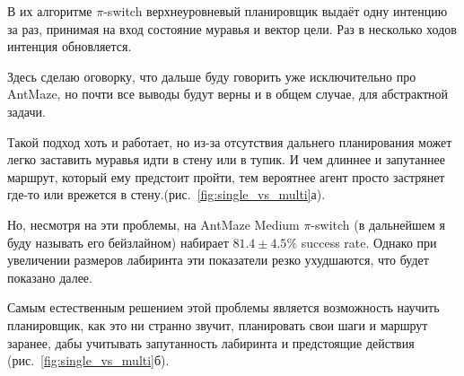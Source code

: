 В их алгоритме $\pi$-switch верхнеуровневый планировщик выдаёт одну интенцию за раз, принимая на вход состояние муравья и вектор цели. Раз в несколько ходов интенция обновляется. 

Здесь сделаю оговорку, что дальше буду говорить уже исключительно про AntMaze, но почти все выводы будут верны и в общем случае, для абстрактной задачи.

Такой подход хоть и работает, но из-за отсутствия дальнего планирования может легко заставить муравья идти в стену или в тупик. И чем длиннее и запутаннее маршрут, который ему предстоит пройти, тем вероятнее агент просто застрянет где-то или врежется в стену.(рис.~\ref{fig:single_vs_multi}а).

Но, несмотря на эти проблемы, на AntMaze Medium $\pi$-switch (в дальнейшем я буду называть его бейзлайном) набирает $81.4 \pm 4.5\%$ success rate. Однако при увеличении размеров лабиринта эти показатели резко ухудшаются, что будет показано далее.

Самым естественным решением этой проблемы является возможность научить планировщик, как это ни странно звучит, планировать свои шаги и маршрут заранее, дабы учитывать запутанность лабиринта и предстоящие действия (рис.~\ref{fig:single_vs_multi}б).






